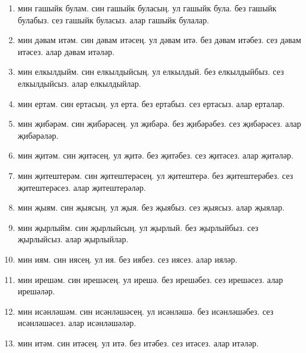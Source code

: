 \documentclass{article}
\begin{document}
\begin{enumerate}
    \item
    мин гашыйк булам.
    син гашыйк буласың.
    ул гашыйк була.
    без гашыйк булабыз.
    сез гашыйк буласыз.
    алар гашыйк булалар.

    \item
    мин дәвам итәм.
    син дәвам итәсең.
    ул дәвам итә.
    без дәвам итәбез.
    сез дәвам итәсез.
    алар дәвам итәләр.

    \item
    мин елкылдыйм.
    син елкылдыйсың.
    ул елкылдый.
    без елкылдыйбыз.
    сез елкылдыйсыз.
    алар елкылдыйлар.

    \item
    мин ертам.
    син ертасың.
    ул ерта.
    без ертабыз.
    сез ертасыз.
    алар ерталар.

    \item
    мин җибәрәм.
    син җибәрәсең.
    ул җибәрә.
    без җибәрәбез.
    сез җибәрәсез.
    алар җибәрәләр.

    \item
    мин җитәм.
    син җитәсең.
    ул җитә.
    без җитәбез.
    сез җитәсез.
    алар җитәләр.

    \item
    мин җитештерәм.
    син җитештерәсең.
    ул җитештерә.
    без җитештерәбез.
    сез җитештерәсез.
    алар җитештерәләр.

    \item
    мин җыям.
    син җыясың.
    ул җыя.
    без җыябыз.
    сез җыясыз.
    алар җыялар.

    \item
    мин җырлыйм.
    син җырлыйсың.
    ул җырлый.
    без җырлыйбыз.
    сез җырлыйсыз.
    алар җырлыйлар.

    \item
    мин иям.
    син иясең.
    ул ия.
    без иябез.
    сез иясез.
    алар ияләр.

    \item
    мин ирешәм.
    син ирешәсең.
    ул ирешә.
    без ирешәбез.
    сез ирешәсез.
    алар ирешәләр.

    \item
    мин исәнләшәм.
    син исәнләшәсең.
    ул исәнләшә.
    без исәнләшәбез.
    сез исәнләшәсез.
    алар исәнләшәләр.

    \item
    мин итәм.
    син итәсең.
    ул итә.
    без итәбез.
    сез итәсез.
    алар итәләр.


\end{enumerate}
\end{document}
